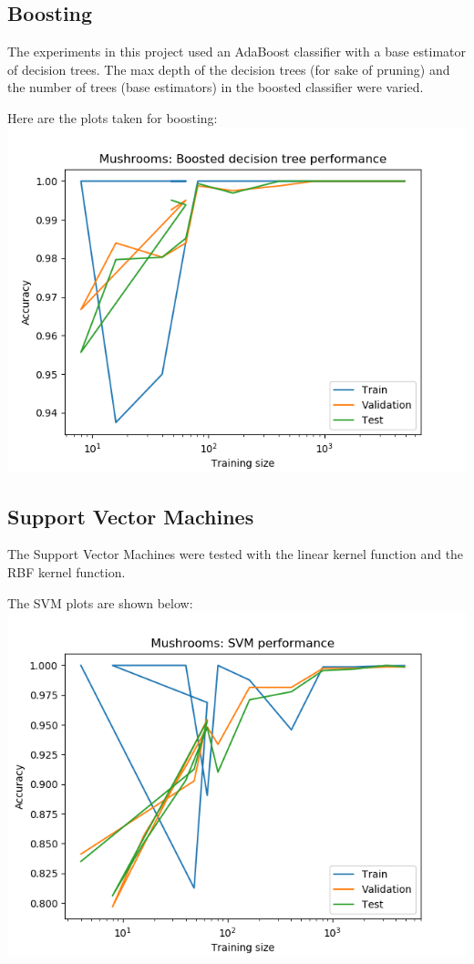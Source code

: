 \documentclass[11pt]{article}
\begin{document}
        \subsection{Boosting}
        The experiments in this project used an AdaBoost classifier with a base estimator of decision trees.
        The max depth of the decision trees (for sake of pruning) and the number of trees (base estimators)
        in the boosted classifier were varied.

        Here are the plots taken for boosting:
        \includegraphics{mushrooms/mushroom_boost_trainingsize.png}

        \subsection{Support Vector Machines}
        The Support Vector Machines were tested with the linear kernel function and the RBF kernel function.

        The SVM plots are shown below:
        \includegraphics{mushrooms/mushroom_svm_trainingsize.png}
\end{document}
